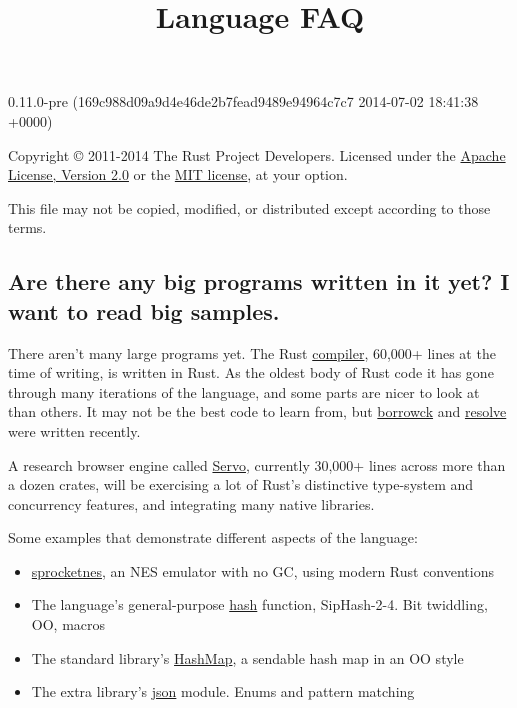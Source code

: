 \documentclass[]{article}
\title{Language FAQ}
\begin{document}
\maketitle

0.11.0-pre (169c988d09a9d4e46de2b7fead9489e94964c7c7 2014-07-02 18:41:38 +0000)

Copyright © 2011-2014 The Rust Project Developers. Licensed under the
\href{http://www.apache.org/licenses/LICENSE-2.0}{Apache License,
Version 2.0} or the \href{http://opensource.org/licenses/MIT}{MIT
license}, at your option.

This file may not be copied, modified, or distributed except according
to those terms.

{
\hypersetup{linkcolor=black}
\setcounter{tocdepth}{3}
\tableofcontents
}
\subsection{Are there any big programs written in it yet? I want to read
big
samples.}\label{are-there-any-big-programs-written-in-it-yet-i-want-to-read-big-samples.}

There aren't many large programs yet. The Rust
\href{https://github.com/rust-lang/rust/tree/master/src/librustc}{compiler},
60,000+ lines at the time of writing, is written in Rust. As the oldest
body of Rust code it has gone through many iterations of the language,
and some parts are nicer to look at than others. It may not be the best
code to learn from, but
\href{https://github.com/rust-lang/rust/blob/master/src/librustc/middle/borrowck/}{borrowck}
and
\href{https://github.com/rust-lang/rust/blob/master/src/librustc/middle/resolve.rs}{resolve}
were written recently.

A research browser engine called
\href{https://github.com/mozilla/servo}{Servo}, currently 30,000+ lines
across more than a dozen crates, will be exercising a lot of Rust's
distinctive type-system and concurrency features, and integrating many
native libraries.

Some examples that demonstrate different aspects of the language:

\begin{itemize}
\itemsep1pt\parskip0pt
\item
  \href{https://github.com/pcwalton/sprocketnes}{sprocketnes}, an NES
  emulator with no GC, using modern Rust conventions
\item
  The language's general-purpose
  \href{https://github.com/rust-lang/rust/blob/master/src/libstd/hash/mod.rs}{hash}
  function, SipHash-2-4. Bit twiddling, OO, macros
\item
  The standard library's
  \href{https://github.com/rust-lang/rust/blob/master/src/libcollections/hashmap.rs}{HashMap},
  a sendable hash map in an OO style
\item
  The extra library's
  \href{https://github.com/rust-lang/rust/blob/master/src/libserialize/json.rs}{json}
  module. Enums and pattern matching
\end{itemize}
\end{document}
